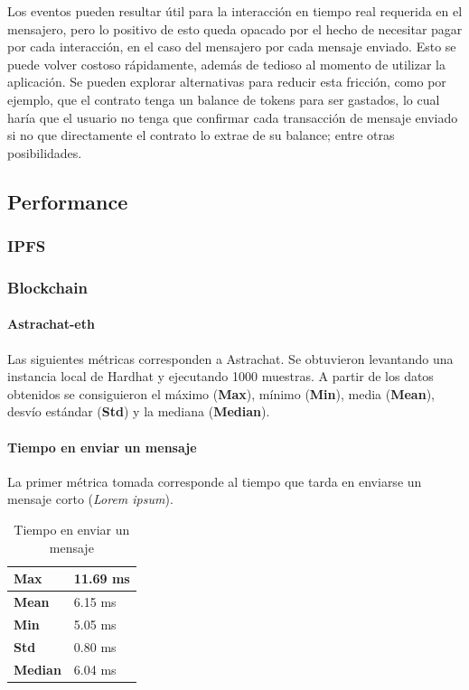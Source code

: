 Los eventos pueden resultar útil para la interacción en tiempo real requerida en el mensajero, pero lo positivo de esto queda opacado por el hecho de necesitar pagar por cada interacción, en el caso del mensajero por cada mensaje enviado. Esto se puede volver costoso rápidamente, además de tedioso al momento de utilizar la aplicación. Se pueden explorar alternativas para reducir esta fricción, como por ejemplo, que el contrato tenga un balance de tokens para ser gastados, lo cual haría que el usuario no tenga que confirmar cada transacción de mensaje enviado si no que directamente el contrato lo extrae de su balance; entre otras posibilidades.

\subsection{Performance}

\subsubsection{IPFS}

\subsubsection{Blockchain}

\paragraph{Astrachat-eth}

Las siguientes métricas corresponden a Astrachat. Se obtuvieron levantando una instancia local de Hardhat \cite{hardhat} y ejecutando 1000 muestras. A partir de los datos obtenidos se consiguieron el máximo (\textbf{Max}), mínimo (\textbf{Min}), media (\textbf{Mean}), desvío estándar (\textbf{Std}) y la mediana (\textbf{Median}).

\paragraph{Tiempo en enviar un mensaje}

La primer métrica tomada corresponde al tiempo que tarda en enviarse un mensaje corto (\textit{Lorem ipsum}).

\setlength\tabcolsep{1pt}
\begin{table}[!htbp]
    \centering
    \begin{tabular}{|m{5em}|m{5em}|}
    \hline
    \textbf{Max} & 11.69 ms \\
    \hline
    \textbf{Mean} & 6.15 ms \\
    \hline
    \textbf{Min} & 5.05 ms \\
    \hline
    \textbf{Std} & 0.80 ms \\
    \hline
    \textbf{Median} & 6.04 ms \\
    \hline
    \end{tabular}
    \caption{Tiempo en enviar un mensaje}
\end{table}

